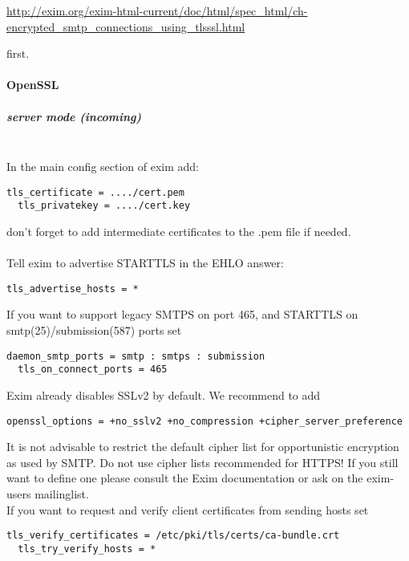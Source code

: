 \url{http://exim.org/exim-html-current/doc/html/spec_html/ch-encrypted_smtp_connections_using_tlsssl.html}

first.

\paragraph*{OpenSSL}

\subparagraph*{server mode (incoming)}\mbox{}\\

In the main config section of exim add:

\begin{lstlisting}[breaklines]
  tls_certificate = ..../cert.pem
  tls_privatekey = ..../cert.key
\end{lstlisting}
don't forget to add intermediate certificates to the .pem file if needed.\\
\\
Tell exim to advertise STARTTLS in the EHLO answer:
\begin{lstlisting}[breaklines]
  tls_advertise_hosts = *
\end{lstlisting}

If you want to support legacy SMTPS on port 465, and STARTTLS on smtp(25)/submission(587) ports set
\begin{lstlisting}[breaklines]
  daemon_smtp_ports = smtp : smtps : submission
  tls_on_connect_ports = 465
\end{lstlisting}

Exim already disables SSLv2 by default. We recommend to add
\begin{lstlisting}[breaklines]
  openssl_options = +no_sslv2 +no_compression +cipher_server_preference
\end{lstlisting}

It is not advisable to restrict the default cipher list for opportunistic encryption as used by SMTP. Do not use cipher lists recommended for HTTPS! If you still want to define one please consult the Exim documentation or ask on the exim-users mailinglist.\\

If you want to request and verify client certificates from sending hosts set
\begin{lstlisting}[breaklines]
  tls_verify_certificates = /etc/pki/tls/certs/ca-bundle.crt
  tls_try_verify_hosts = *
\end{lstlisting}

